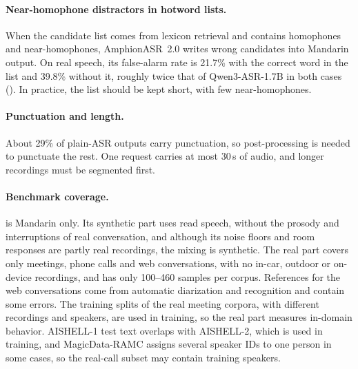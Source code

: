\paragraph{Near-homophone distractors in hotword lists.}
When the candidate list comes from lexicon retrieval and contains homophones and near-homophones, AmphionASR~2.0 writes wrong candidates into Mandarin output.
On real speech, its false-alarm rate is 21.7\% with the correct word in the list and 39.8\% without it, roughly twice that of Qwen3-ASR-1.7B in both cases ().
In practice, the list should be kept short, with few near-homophones.

\paragraph{Punctuation and length.}
About 29\% of plain-ASR outputs carry punctuation, so post-processing is needed to punctuate the rest.
One request carries at most 30\,s of audio, and longer recordings must be segmented first.

\paragraph{Benchmark coverage.}
\tsbench is Mandarin only.
Its synthetic part uses read speech, without the prosody and interruptions of real conversation, and although its noise floors and room responses are partly real recordings, the mixing is synthetic.
The real part covers only meetings, phone calls and web conversations, with no in-car, outdoor or on-device recordings, and has only 100--460 samples per corpus.
References for the web conversations come from automatic diarization and recognition and contain some errors.
The training splits of the real meeting corpora, with different recordings and speakers, are used in training, so the real part measures in-domain behavior.
AISHELL-1 test text overlaps with AISHELL-2, which is used in training, and MagicData-RAMC assigns several speaker IDs to one person in some cases, so the real-call subset may contain training speakers.
